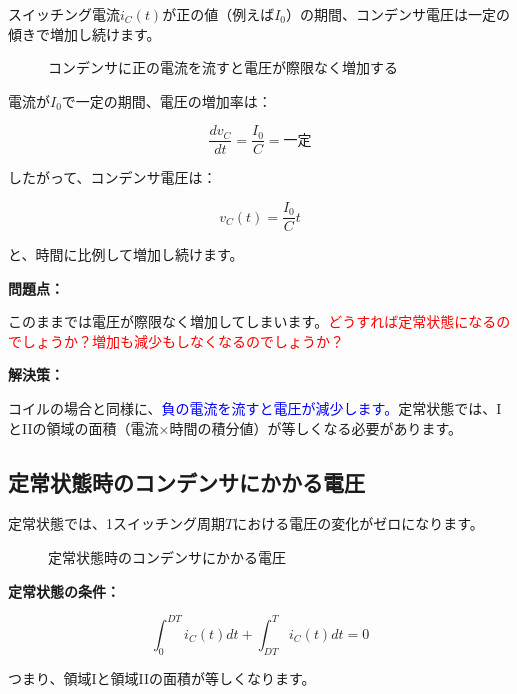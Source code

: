 スイッチング電流$i_C(t)$が正の値（例えば$I_0$）の期間、コンデンサ電圧は一定の傾きで増加し続けます。

\begin{figure}[H]
\centering
{}
\caption{コンデンサに正の電流を流すと電圧が際限なく増加する}
\label{fig:ch04_capacitor_increasing}
\end{figure}

電流が$I_0$で一定の期間、電圧の増加率は：

\begin{equation}
\frac{dv_C}{dt} = \frac{I_0}{C} = \text{一定}
\end{equation}

したがって、コンデンサ電圧は：

\begin{equation}
v_C(t) = \frac{I_0}{C} t
\end{equation}

と、時間に比例して増加し続けます。

\textbf{問題点：}

このままでは電圧が際限なく増加してしまいます。\textcolor{red}{どうすれば定常状態になるのでしょうか？増加も減少もしなくなるのでしょうか？}

\textbf{解決策：}

コイルの場合と同様に、\textcolor{blue}{負の電流を流すと電圧が減少します。}定常状態では、IとIIの領域の面積（電流×時間の積分値）が等しくなる必要があります。

\subsection{定常状態時のコンデンサにかかる電圧}

定常状態では、1スイッチング周期$T$における電圧の変化がゼロになります。

\begin{figure}[H]
\centering
{}
\caption{定常状態時のコンデンサにかかる電圧}
\label{fig:ch04_capacitor_steady}
\end{figure}

\textbf{定常状態の条件：}

\begin{equation}
\int_0^{DT} i_C(t)dt + \int_{DT}^{T} i_C(t)dt = 0
\end{equation}

つまり、領域Iと領域IIの面積が等しくなります。


